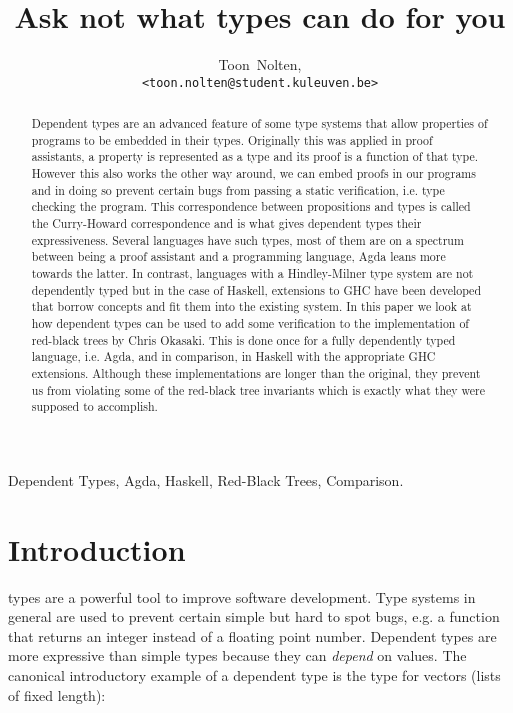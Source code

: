 \documentclass[journal, retainorgcmds]{IEEEtran}
\begin{document}
\title{Ask not what types can do for you}
\author{Toon~Nolten,\\ \texttt{<toon.nolten@student.kuleuven.be>}}%
\maketitle


\begin{abstract}
  Dependent types are an advanced feature of some type systems that allow
  properties of programs to be embedded in their types.
  Originally this was applied in proof assistants, a property is represented
  as a type and its proof is a function of that type.
  However this also works the other way around, we can embed proofs in our
  programs and in doing so prevent certain bugs from passing a static
  verification, i.e. type checking the program.
  This correspondence between propositions and types is called the
  Curry-Howard correspondence and is what gives dependent types their
  expressiveness.
  Several languages have such types, most of them are on a spectrum between
  being a proof assistant and a programming language, Agda leans more towards
  the latter.
  In contrast, languages with a Hindley-Milner type system are not dependently
  typed but in the case of Haskell, extensions to GHC have been developed that
  borrow concepts and fit them into the existing system.
  In this paper we look at how dependent types can be used to add some
  verification to the implementation of red-black trees by Chris Okasaki.
  This is done once for a fully dependently typed language, i.e. Agda, and in
  comparison, in Haskell with the appropriate GHC extensions.
  Although these implementations are longer than the original, they prevent us
  from violating some of the red-black tree invariants which is exactly what
  they were supposed to accomplish.
\end{abstract}

\begin{IEEEkeywords}
  Dependent Types, Agda, Haskell, Red-Black Trees, Comparison.
\end{IEEEkeywords}


\section{Introduction}
 types are a powerful tool to improve software
development.
Type systems in general are used to prevent certain simple but hard to spot
bugs, e.g. a function that returns an integer instead of a floating point
number.
Dependent types are more expressive than simple types because they can
\emph{depend} on values.
The canonical introductory example of a dependent type is the type for vectors
(lists of fixed length):
\end{document}
